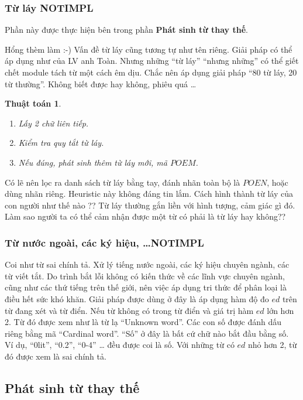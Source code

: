\documentclass[a4paper]{book} %
\newtheorem{algo}{Thuật toán}
\begin{document}
\subsubsection{Từ láy NOTIMPL}

Phần này được thực hiện bên trong phần \textbf{Phát sinh từ thay thế}.

Hổng thèm làm :-) Vấn đề từ láy cũng tương tự như  tên riêng. Giải
pháp có thể áp dụng như của LV anh Toàn. Nhưng những ``từ láy''
``nhưng những'' có thể giết chết module tách từ một cách êm dịu. Chắc
nên áp dụng giải pháp ``80 từ láy, 20 từ thường''. Không biết được hay
không, phiêu quá \ldots

\begin{algo}
  \begin{enumerate}
  \item Lấy 2 chữ liên tiếp.
  \item Kiểm tra quy tắt từ láy.
  \item Nếu đúng, phát sinh thêm từ láy mới, mã $POEM$.
  \end{enumerate}
\end{algo}

Có lẽ nên lọc ra danh sách từ láy bằng tay, đánh nhãn toàn bộ là
$POEN$, hoặc dùng nhãn riêng. Heuristic này không đáng tin lắm.
Cách hình thành từ láy của con người như thế nào ?? Từ láy thường gắn
liền với hình tượng, cảm giác gì đó. Làm sao người ta có thể cảm nhận
được một từ có phải là từ láy hay không??

\subsubsection{Từ nước ngoài, các ký hiệu, \ldots NOTIMPL}

Coi như từ sai chính tả.
Xử lý tiếng nước ngoài, các ký hiệu chuyên ngành, các từ viết tắt. Do
trình bắt lỗi không có kiến thức về các lĩnh vực chuyên 
ngành, cũng như các thứ tiếng trên thế giới, nên việc áp dụng tri thức
để phân loại là điều hết sức khó khăn. Giải pháp được dùng ở đây là áp
dụng hàm độ đo $ed$ trên từ đang xét và từ điển. Nếu từ không có trong
từ điển và giá trị hàm $ed$ lớn hơn 2. Từ đó được xem như là từ lạ
``Unknown word''. Các con số được đánh dấu riêng bằng mã ``Cardinal word''.
``Số'' ở đây là bất cứ chữ nào bắt đầu bằng số. Ví dụ, ``0lit'',
``0.2'', ``0-4'' \ldots{} đều được coi là số. Với những từ có $ed$ nhỏ
hơn 2, từ đó được xem là sai chính tả. 

\subsection{Phát sinh từ thay thế}
\end{document}
